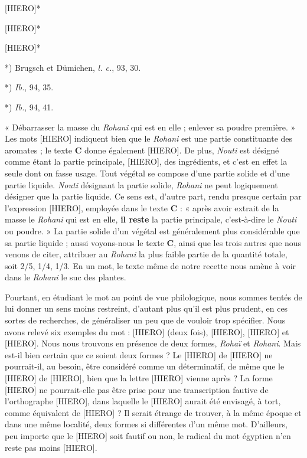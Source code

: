 \documentclass[a4paper, 11pt, oneside]{article}
\begin{document}
[HIERO]*

[HIERO]*

[HIERO]*

*) Brugsch et Dümichen, \emph{l. c.}, 93, 30.

*) \emph{Ib.}, 94, 35.

*) \emph{Ib.}, 94, 41.

« Débarrasser la masse du \emph{Rohani} qui est en elle ; enlever sa poudre première. » Les mots [HIERO] indiquent bien que le \emph{Rohani} est une partie constituante des aromates ; le texte \textbf{C} donne également [HIERO]. De plus, \emph{Nouti} est désigné comme étant la partie principale, [HIERO], des ingrédients, et c'est en effet la seule dont on fasse usage. Tout végétal se compose d'une partie solide et d'une partie liquide. \emph{Nouti} désignant la partie solide, \emph{Rohani} ne peut logiquement désigner que la partie liquide. Ce sens est, d'autre part, rendu presque certain par l'expression [HIERO], employée dans le texte \textbf{C} : « après avoir extrait de la masse le \emph{Rohani} qui est en elle, \textbf{il reste} la partie principale, c'est-à-dire le \emph{Nouti} ou poudre. » La partie solide d'un végétal est généralement plus considérable que sa partie liquide ; aussi voyons-nous le texte \textbf{C}, ainsi que les trois autres que nous venons de citer, attribuer au \emph{Rohani} la plus faible partie de la quantité totale, soit 2/5, 1/4, 1/3. En un mot, le texte même de notre recette nous amène à voir dans le \emph{Rohani} le suc des plantes.

Pourtant, en étudiant le mot au point de vue philologique, nous sommes tentés de lui donner un sens moins restreint, d'autant plus qu'il est plus prudent, en ces sortes de recherches, de généraliser un peu que de vouloir trop spécifier. Nous avons relevé six exemples du mot : [HIERO] (deux fois), [HIERO], [HIERO] et [HIERO]. Nous nous trouvons en présence de deux formes, \emph{Rohaï} et \emph{Rohani}. Mais est-il bien certain que ce soient deux formes ? Le [HIERO] de [HIERO] ne pourrait-il, au besoin, être considéré comme un déterminatif, de même que le [HIERO] de [HIERO], bien que la lettre [HIERO] vienne après ? La forme [HIERO] ne pourrait-elle pas être prise pour une transcription fautive de l'orthographe [HIERO], dans laquelle le [HIERO] aurait été envisagé, à tort, comme équivalent de [HIERO] ? Il serait étrange de trouver, à la même époque et dans une même localité, deux formes si différentes d'un même mot. D'ailleurs, peu importe que le [HIERO] soit fautif ou non, le radical du mot égyptien n'en reste pas moins [HIERO].
\end{document}
